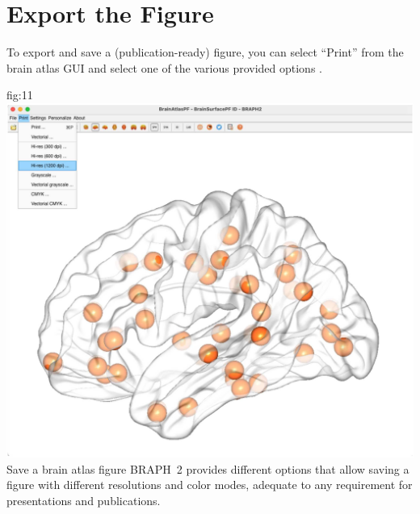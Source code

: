 \documentclass[justified]{tufte-handout}
\begin{document}
\clearpage
\section{Export the Figure}

To export and save a (publication-ready) figure, you can select ``Print'' from the brain atlas GUI and select one of the various provided options .

	{fig:11}
	{\includegraphics{fig11.jpg}}
	{Save a brain atlas figure}
	{
	BRAPH~2 provides different options that allow saving a figure with different resolutions and color modes, adequate to any requirement for presentations and publications.
	}
	
\end{document}
